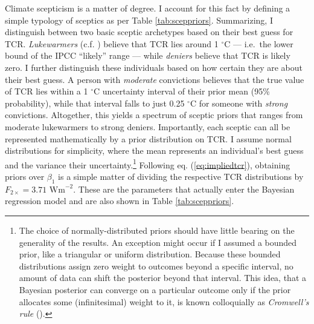 \documentclass[smallextended]{svjour3}       %
\begin{document}
Climate scepticism is a matter of degree. I account for this fact by
defining a simple typology of sceptics as per Table
\ref{tab:sceppriors}. Summarizing, I distinguish between two basic
sceptic archetypes based on their best guess for TCR.
\textit{Lukewarmers} (c.f. \cite{ridley2015lukewarmer}) believe that TCR
lies around 1 \(^\circ\)C --- i.e.~the lower bound of the IPCC
``likely'' range --- while \textit{deniers} believe that TCR is likely
zero. I further distinguish these individuals based on how certain they
are about their best guess. A person with \textit{moderate} convictions
believes that the true value of TCR lies within a 1 \(^\circ\)C
uncertainty interval of their prior mean (95\% probability), while that
interval falls to just 0.25 \(^\circ\)C for someone with \textit{strong}
convictions. Altogether, this yields a spectrum of sceptic priors that
ranges from moderate lukewarmers to strong deniers. Importantly, each
sceptic can all be represented mathematically by a prior distribution on
TCR. I assume normal distributions for simplicity, where the mean
represents an individual's best guess and the variance their
uncertainty.\footnote{The choice of normally-distributed priors should
  have little bearing on the generality of the results. An exception
  might occur if I assumed a bounded prior, like a triangular or uniform
  distribution. Because these bounded distributions assign zero weight
  to outcomes beyond a specific interval, no amount of data can shift
  the posterior beyond that interval. This idea, that a Bayesian
  posterior can converge on a particular outcome only if the prior
  allocates some (infinitesimal) weight to it, is known colloquially as
  \emph{Cromwell's rule} (\cite{jackman2009bayesian}).} Following eq.
(\ref{eq:impliedtcr}), obtaining priors over \(\beta_1\) is a simple
matter of dividing the respective TCR distributions by
\(F_{2\times}=3.71\text{ Wm}^{-2}\). These are the parameters that
actually enter the Bayesian regression model and are also shown in Table
\ref{tab:sceppriors}.
\end{document}
